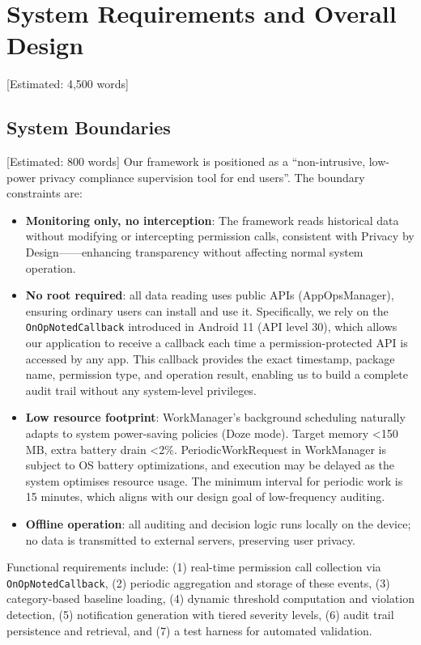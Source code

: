 \newpage\section{System Requirements and Overall Design} [Estimated: 4,500 words]

\subsection{System Boundaries} [Estimated: 800 words]
Our framework is positioned as a ``non-intrusive, low-power privacy compliance supervision tool for end users''. The boundary constraints are:

\begin{itemize}
\item \textbf{Monitoring only, no interception}: The framework reads historical data without modifying or intercepting permission calls, consistent with Privacy by Design——enhancing transparency without affecting normal system operation.
\item \textbf{No root required}: all data reading uses public APIs (AppOpsManager), ensuring ordinary users can install and use it. Specifically, we rely on the \texttt{OnOpNotedCallback} introduced in Android 11 (API level 30), which allows our application to receive a callback each time a permission-protected API is accessed by any app. This callback provides the exact timestamp, package name, permission type, and operation result, enabling us to build a complete audit trail without any system-level privileges.
\item \textbf{Low resource footprint}: WorkManager's background scheduling naturally adapts to system power-saving policies (Doze mode). Target memory <150 MB, extra battery drain <2\%. PeriodicWorkRequest in WorkManager is subject to OS battery optimizations, and execution may be delayed as the system optimises resource usage. The minimum interval for periodic work is 15 minutes, which aligns with our design goal of low-frequency auditing.
\item \textbf{Offline operation}: all auditing and decision logic runs locally on the device; no data is transmitted to external servers, preserving user privacy.
\end{itemize}

Functional requirements include: (1) real-time permission call collection via \texttt{OnOpNotedCallback}, (2) periodic aggregation and storage of these events, (3) category-based baseline loading, (4) dynamic threshold computation and violation detection, (5) notification generation with tiered severity levels, (6) audit trail persistence and retrieval, and (7) a test harness for automated validation.

